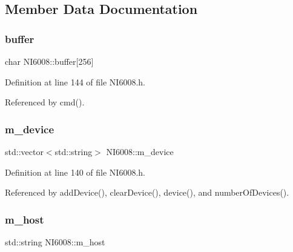 \subsection{Member Data Documentation}
\mbox{\label{classNI6008_afd7bb102ac107f43a8f02581e1d3abfc}} 
\subsubsection{\texorpdfstring{buffer}{buffer}}
{\footnotesize\ttfamily char N\+I6008\+::buffer\mbox{[}256\mbox{]}\hspace{0.3cm}{\ttfamily [protected]}}



Definition at line 144 of file N\+I6008.\+h.



Referenced by cmd().

\mbox{\label{classNI6008_ac7225d517d42b1b7553dc75dccb29b58}} 
\subsubsection{\texorpdfstring{m\+\_\+device}{m\_device}}
{\footnotesize\ttfamily std\+::vector$<$std\+::string$>$ N\+I6008\+::m\+\_\+device\hspace{0.3cm}{\ttfamily [protected]}}



Definition at line 140 of file N\+I6008.\+h.



Referenced by add\+Device(), clear\+Device(), device(), and number\+Of\+Devices().

\mbox{\label{classNI6008_ab8b247caa89b1dc9b9c78b0c1b08ed5d}} 
\subsubsection{\texorpdfstring{m\+\_\+host}{m\_host}}
{\footnotesize\ttfamily std\+::string N\+I6008\+::m\+\_\+host\hspace{0.3cm}{\ttfamily [protected]}}



